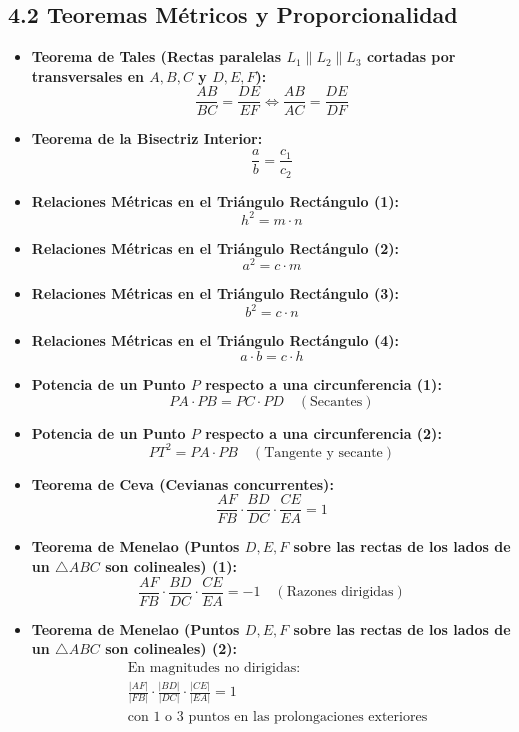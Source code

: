\documentclass[11pt,a4paper]{article}
\begin{document}
\subsection*{4.2 Teoremas Métricos y Proporcionalidad}

\begin{itemize}
  \item \textbf{Teorema de Tales (Rectas paralelas $L_1 \parallel L_2 \parallel L_3$ cortadas por transversales en $A, B, C$ y $D, E, F$):}
  \[
    \frac{AB}{BC} = \frac{DE}{EF} \iff \frac{AB}{AC} = \frac{DE}{DF}
  \]
  \item \textbf{Teorema de la Bisectriz Interior:}
  \[
    \frac{a}{b} = \frac{c_1}{c_2}
  \]
  \item \textbf{Relaciones Métricas en el Triángulo Rectángulo (1):}
  \[
    h^2 = m \cdot n
  \]
  \item \textbf{Relaciones Métricas en el Triángulo Rectángulo (2):}
  \[
    a^2 = c \cdot m
  \]
  \item \textbf{Relaciones Métricas en el Triángulo Rectángulo (3):}
  \[
    b^2 = c \cdot n
  \]
  \item \textbf{Relaciones Métricas en el Triángulo Rectángulo (4):}
  \[
    a \cdot b = c \cdot h
  \]
  \item \textbf{Potencia de un Punto $P$ respecto a una circunferencia (1):}
  \[
    PA \cdot PB = PC \cdot PD \quad (\text{Secantes})
  \]
  \item \textbf{Potencia de un Punto $P$ respecto a una circunferencia (2):}
  \[
    PT^2 = PA \cdot PB \quad (\text{Tangente y secante})
  \]
  \item \textbf{Teorema de Ceva (Cevianas concurrentes):}
  \[
    \frac{AF}{FB} \cdot \frac{BD}{DC} \cdot \frac{CE}{EA} = 1
  \]
  \item \textbf{Teorema de Menelao (Puntos $D, E, F$ sobre las rectas de los lados de un $\triangle ABC$ son colineales) (1):}
  \[
    \frac{AF}{FB} \cdot \frac{BD}{DC} \cdot \frac{CE}{EA} = -1 \quad (\text{Razones dirigidas})
  \]
  \item \textbf{Teorema de Menelao (Puntos $D, E, F$ sobre las rectas de los lados de un $\triangle ABC$ son colineales) (2):}
  \[
    \begin{aligned}
      &\text{En magnitudes no dirigidas: } \\
      &\frac{|AF|}{|FB|} \cdot \frac{|BD|}{|DC|} \cdot \frac{|CE|}{|EA|} = 1 \\
      &\text{con 1 o 3 puntos en las prolongaciones exteriores}
    \end{aligned}
  \]
\end{itemize}
\end{document}
